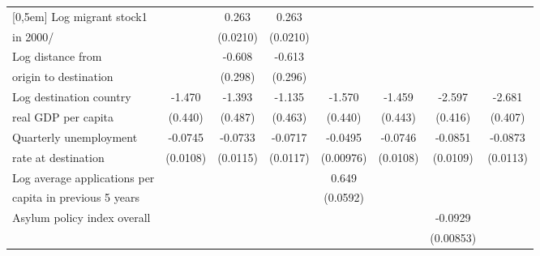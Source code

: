 \begin{table}[htbp]
\begin{tabular}{l*{7}{c}}
[0,5em]
Log migrant stock1&                     &       0.263\sym{***}&       0.263\sym{***}&                     &                     &                     &                     \\
 in 2000/                    &                     &    (0.0210)         &    (0.0210)         &                     &                     &                     &                     \\
[0,5em]
Log distance from &                     &      -0.608\sym{*}  &      -0.613\sym{*}  &                     &                     &                     &                     \\
origin to destination                    &                     &     (0.298)         &     (0.296)         &                     &                     &                     &                     \\
[0,5em]
Log destination country&      -1.470\sym{**} &      -1.393\sym{**} &      -1.135\sym{*}  &      -1.570\sym{***}&      -1.459\sym{**} &      -2.597\sym{***}&      -2.681\sym{***}\\
real GDP per capita                    &     (0.440)         &     (0.487)         &     (0.463)         &     (0.440)         &     (0.443)         &     (0.416)         &     (0.407)         \\
[0,5em]
Quarterly unemployment&     -0.0745\sym{***}&     -0.0733\sym{***}&     -0.0717\sym{***}&     -0.0495\sym{***}&     -0.0746\sym{***}&     -0.0851\sym{***}&     -0.0873\sym{***}\\
rate at destination                    &    (0.0108)         &    (0.0115)         &    (0.0117)         &   (0.00976)         &    (0.0108)         &    (0.0109)         &    (0.0113)         \\
[0,5em]
Log average applications per &                     &                     &                     &       0.649\sym{***}&                     &                     &                     \\
capita in previous 5 years                    &                     &                     &                     &    (0.0592)         &                     &                     &                     \\
[0,5em]
Asylum policy index overall&                     &                     &                     &                     &                     &     -0.0929\sym{***}&                     \\
                    &                     &                     &                     &                     &                     &   (0.00853)         &                     \\

\end{tabular}
\end{table}

